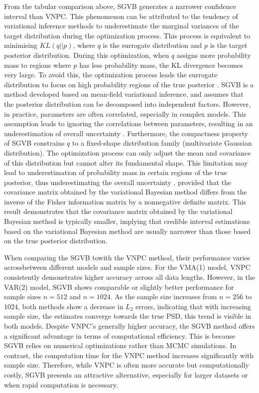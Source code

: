 \documentclass[%
 reprint,
 amsmath,amssymb,
 aps,
]{revtex4-2}
\begin{document}
From the tabular comparison above, SGVB generates a narrower confidence interval than VNPC. This phenomenon can be attributed to the tendency of variational inference methods to underestimate the marginal variances of the target distribution during the optimization process. This process is equivalent to minimising $KL(q||p)$, where $q$ is the surrogate distribution and $p$ is the target posterior distribution. During this optimization, when $q$ assigns more probability mass to regions where $p$ has less probability mass, the KL divergence becomes very large. To avoid this, the optimization process leads the surrogate distribution to focus on high probability regions of the true posterior \cite{Blei2017}. SGVB is a method developed based on mean-field variational inference, and assumes that the posterior distribution can be decomposed into independent factors. However, in practice, parameters are often correlated, especially in complex models. This assumption leads to ignoring the correlations between parameters, resulting in an underestimation of overall uncertainty \cite{Blei2006}. Furthermore, the compactness property of SGVB constrains $q$ to a fixed-shape distribution family (multivariate Gaussian distribution). The optimization process can only adjust the mean and covariance of this distribution but cannot alter its fundamental shape. This limitation may lead to underestimation of probability mass in certain regions of the true posterior, thus underestimating the overall uncertainty \cite{Turner2011}. \cite{Wang2005} provided that the covariance matrix obtained by the variational Bayesian method differs from the inverse of the Fisher information matrix by a nonnegative definite matrix. This result demonstrates that the covariance matrix obtained by the variational Bayesian method is typically smaller, implying that credible interval estimations based on the variational Bayesian method are usually narrower than those based on the true posterior distribution.


When comparing the SGVB towith the VNPC method, their performance varies acrossbetween different models and sample sizes. For the VMA(1) model, VNPC consistently demonstrates higher accuracy across all data lengths. However, in the VAR(2) model, SGVB shows comparable or slightly better performance for sample sizes $n=512$ and $n=1024$. As the sample size increases from $n=256$ to $1024$, both methods show a decrease in $L_2$ errors, indicating that with increasing sample size, the estimates converge towards the true PSD, this trend is visible in both models. Despite VNPC's generally higher accuracy, the SGVB method offers a significant advantage in terms of computational efficiency. This is because SGVB relies on numerical optimizations rather than MCMC simulations. In contrast, the computation time for the VNPC method increases significantly with sample size. Therefore, while VNPC is often more accurate but computationally costly, SGVB presents an attractive alternative, especially for larger datasets or when rapid computation is necessary.
\end{document}

